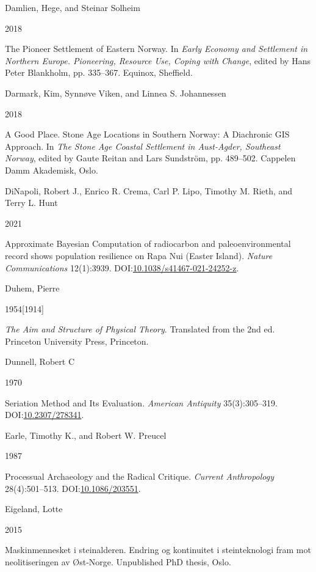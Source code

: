 \documentclass[
  a4paper,
  oneside]{uiophdthesis}
\newlength{\cslhangindent}
\newlength{\csllabelwidth}
\newlength{\cslentryspacingunit} %
\newenvironment{CSLReferences}[2] %
 {%
  \setlength{\parindent}{0pt}
  \ifodd #1
  \let\oldpar\par
  \def\par{\hangindent=\cslhangindent\oldpar}
  \fi
  \setlength{\parskip}{#2\cslentryspacingunit}
 }%
 {}
\newcommand{\CSLBlock}[1]{#1\hfill\break}
\newcommand{\CSLLeftMargin}[1]{\parbox[t]{\csllabelwidth}{#1}}
\newcommand{\CSLRightInline}[1]{\parbox[t]{\linewidth - \csllabelwidth}{#1}\break}
\begin{document}
\begin{CSLReferences}{0}{0}
\leavevmode{}%
\CSLBlock{Damlien, Hege, and Steinar Solheim}
\CSLLeftMargin{ 2018}
\CSLRightInline{{The Pioneer Settlement of Eastern Norway}. In \emph{{Early Economy and Settlement in Northern Europe. Pioneering, Resource Use, Coping with Change}}, edited by Hans Peter Blankholm, pp. 335--367. Equinox, Sheffield.}

\leavevmode{}%
\CSLBlock{Darmark, Kim, Synnøve Viken, and Linnea S. Johannessen}
\CSLLeftMargin{ 2018}
\CSLRightInline{{A Good Place. Stone Age Locations in Southern Norway: A Diachronic GIS Approach}. In \emph{{The Stone Age Coastal Settlement in Aust-Agder, Southeast Norway}}, edited by Gaute Reitan and Lars Sundström, pp. 489--502. Cappelen Damm Akademisk, Oslo.}

\leavevmode{}%
\CSLBlock{DiNapoli, Robert J., Enrico R. Crema, Carl P. Lipo, Timothy M. Rieth, and Terry L. Hunt}
\CSLLeftMargin{ 2021}
\CSLRightInline{{Approximate Bayesian Computation of radiocarbon and paleoenvironmental record shows population resilience on Rapa Nui (Easter Island)}. \emph{Nature Communications} 12(1):3939. DOI:\href{https://doi.org/10.1038/s41467-021-24252-z}{10.1038/s41467-021-24252-z}.}

\leavevmode{}%
\CSLBlock{Duhem, Pierre}
\CSLLeftMargin{ 1954{[}1914{]}}
\CSLRightInline{\emph{{The Aim and Structure of Physical Theory}}. Translated from the 2nd ed. Princeton University Press, Princeton.}

\leavevmode{}%
\CSLBlock{Dunnell, Robert C}
\CSLLeftMargin{ 1970}
\CSLRightInline{{Seriation Method and Its Evaluation}. \emph{American Antiquity} 35(3):305--319. DOI:\href{https://doi.org/10.2307/278341}{10.2307/278341}.}

\leavevmode{}%
\CSLBlock{Earle, Timothy K., and Robert W. Preucel}
\CSLLeftMargin{ 1987}
\CSLRightInline{{Processual Archaeology and the Radical Critique}. \emph{Current Anthropology} 28(4):501--513. DOI:\href{https://doi.org/10.1086/203551}{10.1086/203551}.}

\leavevmode{}%
\CSLBlock{Eigeland, Lotte}
\CSLLeftMargin{ 2015}
\CSLRightInline{{Maskinmennesket i steinalderen. Endring og kontinuitet i steinteknologi fram mot neolitiseringen av Øst-Norge}. Unpublished PhD thesis, Oslo.}


\end{CSLReferences}
\end{document}
